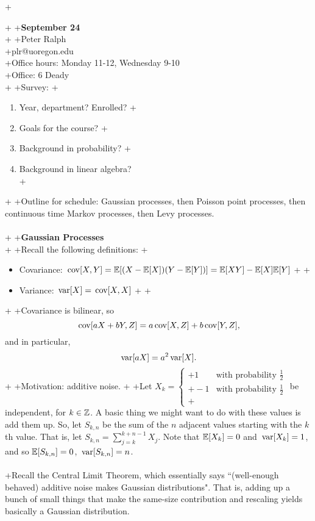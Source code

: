 +\documentclass{article}
\begin{document}
+
+\textbf{\Large September 24}\\
+
+\noindent Peter Ralph\\
+plr@uoregon.edu\\
+Office hours: Monday 11-12, Wednesday 9-10\\
+Office: 6 Deady\\
+
+\noindent Survey:
+\begin{enumerate}
+\item Year, department?  Enrolled?
+\item Goals for the course?
+\item Background in probability?
+\item Background in linear algebra?\\
+\end{enumerate}
+
+Outline for schedule: Gaussian processes, then Poisson point processes, then continuous time Markov processes, then Levy processes.\\\\
+
+\textbf{\Large Gaussian Processes}\\
+
+Recall the following definitions:
+\begin{itemize}
+
+\item Covariance: $\,\mathrm{cov}[X,Y]=\mathbb{E}[(X-\mathbb{E}[X])(Y-\mathbb{E}[Y])]=\mathbb{E}[XY]-\mathbb{E}[X]\mathbb{E}[Y]$
+
+\item Variance: $\,\mathrm{var}[X]=\,\mathrm{cov}[X,X]$
+
+\end{itemize}
+
+Covariance is bilinear, so \[\,\mathrm{cov}[aX+bY,Z]=a\,\mathrm{cov}[X,Z]+b\,\mathrm{cov}[Y,Z],\] and in particular, \[\,\mathrm{var}[aX]=a^2\,\mathrm{var}[X].\]
+
+Motivation: additive noise.
+
+Let $X_k=\left\{\begin{array}{cc}
+1 &\text{with probability }\frac{1}{2}\\
+-1 & \text{with probability }\frac{1}{2}\\
+\end{array}\right.$ be independent, for $k\in\mathbb{Z}$.  A basic thing we might want to do with these values is add them up.  So, let $S_{k,n}$ be the sum of the $n$ adjacent values starting with the $k$th value.  That is, let $S_{k,n}=\sum_{j=k}^{k+n-1}X_j$.  Note that $\mathbb{E}[X_k]=0$ and $\,\mathrm{var}[X_k]=1$, and so $\mathbb{E}[S_{k,n}]=0$, $\,\mathrm{var}[S_{k,n}]=n$.\\\\
+Recall the Central Limit Theorem, which essentially says ``(well-enough behaved) additive noise makes Gaussian distributions".  That is, adding up a bunch of small things that make the same-size contribution and rescaling yields basically a Gaussian distribution.\\\\
\end{document}
